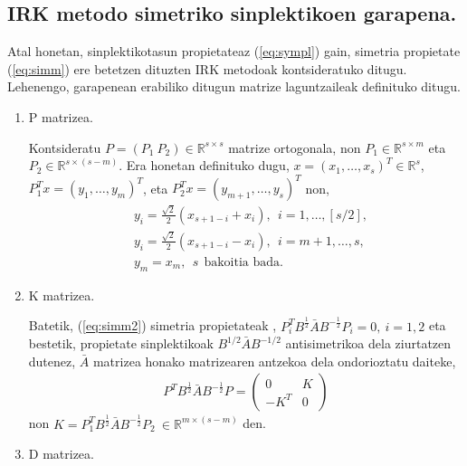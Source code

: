 \subsection{IRK metodo simetriko sinplektikoen garapena.}
\label{ss:734}

Atal honetan, sinplektikotasun propietateaz  (\ref{eq:sympl}) gain, simetria propietate (\ref{eq:simm}) ere betetzen dituzten IRK metodoak kontsideratuko ditugu. Lehenengo, garapenean erabiliko ditugun matrize laguntzaileak definituko ditugu.

\begin{enumerate}
\item P matrizea.

Kontsideratu $P=(P_1 \ P_2) \in \mathbb{R}^{s \times s}$ matrize ortogonala, non $P_1 \in \mathbb{R}^{s \times m}$ eta $P_2 \in \mathbb{R}^{s \times (s-m)}$. Era honetan definituko dugu,  $x=(x_1,\dots,x_s)^T \in \mathbb{R}^s$, $P_1^Tx=(y_1,\dots,y_m)^T$, eta $P_2^Tx=(y_{m+1},\dots,y_s)^T$ non,
\begin{align*}
&y_i = \frac{\sqrt{2}}{2} (x_{s+1-i}+x_i), \ \ i=1,\dots,[s/2], \\
&y_i =\frac{\sqrt{2}}{2} (x_{s+1-i}-x_{i}), \ \ i=m+1,\dots,s, \\
&y_{m} = x_{m}, \ \ s \ \ \mbox{bakoitia bada}.
\end{align*}  

\item K matrizea.

Batetik, (\ref{eq:simm2}) simetria propietateak ,  $P_i^TB^{\frac{1}{2}}\bar{A}B^{-\frac{1}{2}}P_i=0, \ i=1,2$  eta bestetik, propietate sinplektikoak $B^{1/2}\bar{A}B^{-1/2}$ antisimetrikoa dela ziurtatzen dutenez, $\bar{A}$ matrizea honako matrizearen antzekoa dela ondorioztatu daiteke,
\begin{align}
P^TB^{\frac{1}{2}}\bar{A}B^{-\frac{1}{2}}P=
\left(
\begin{matrix}
0 & K \\
-K^T & 0
\end{matrix}
\right)
\end{align}
non $K=P_1^TB^{\frac{1}{2}}\bar{A}B^{-\frac{1}{2}}P_2 \ \in \mathbb{R}^{m \times (s-m)}$ den.

\item D matrizea.


\end{enumerate}
